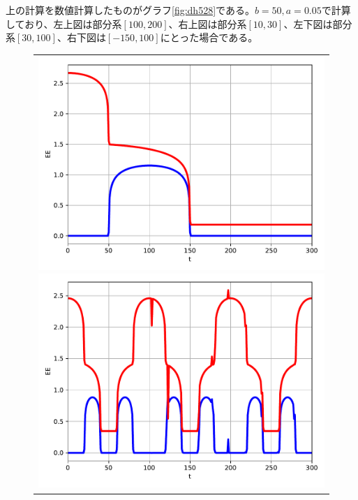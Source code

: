 上の計算を数値計算したものがグラフ\ref{fig:dh528}である。$b=50,a=0.05$で計算しており、左上図は部分系$[100,200]$、右上図は部分系$[10,30]$、左下図は部分系$[30,100]$、右下図は$[-150,100]$にとった場合である。
\begin{figure}[H]
	\centering
	\begin{tabular}{c}
		\begin{minipage}{0.50\hsize}
			\centering
			\includegraphics[width=\linewidth]{dh528_100_200.pdf}
		\end{minipage}
		\begin{minipage}{0.50\hsize}
			\centering
			\includegraphics[width=\linewidth]{dh528_10_30.pdf}
		\end{minipage}

\end{tabular}
\end{figure}
